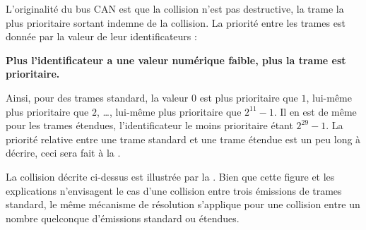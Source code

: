 L'originalité du bus CAN est que la collision n'est pas destructive, la trame la plus prioritaire sortant indemne de la collision. La priorité entre les trames est donnée par la valeur de leur identificateurs :

{\bf Plus l'identificateur a une valeur numérique faible, plus la trame est prioritaire.}

Ainsi, pour des trames standard, la valeur $0$ est plus prioritaire que $1$, lui-même plus prioritaire que $2$, \dots, lui-même plus prioritaire que $2^{11}-1$. Il en est de même pour les trames étendues, l'identificateur le moins prioritaire étant $2^{29}-1$. La priorité relative entre une trame standard et une trame étendue est un peu long à décrire, ceci sera fait à la .

La collision décrite ci-dessus est illustrée par la . Bien que cette figure et les explications n'envisagent le cas d'une collision entre trois émissions de trames standard, le même mécanisme de résolution s'applique pour une collision entre un nombre quelconque d'émissions standard ou étendues. 


